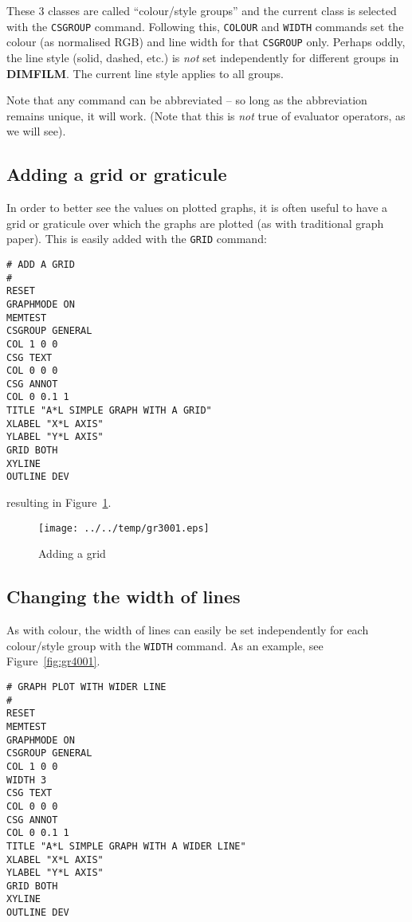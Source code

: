 \documentclass[a4paper,twoside,11pt]{article}
\makeatletter
\def\maxwidth{%
  \ifdim\Gin@nat@width>\linewidth
    \linewidth
  \else
    \Gin@nat@width
  \fi
}
\newcommand{\newpara}{\par\vspace{4mm}\noindent}
\makeatother
\begin{document}
\newpara
These 3 classes are called ``colour/style groups'' and the current class
is selected with the \texttt{CSGROUP} command. Following this,
\texttt{COLOUR} and \texttt{WIDTH} commands set the colour (as
normalised RGB) and line width for that \texttt{CSGROUP} only. Perhaps
oddly, the line style (solid, dashed, etc.) is \emph{not} set
independently for different groups in \textbf{DIMFILM}. The current line style applies to
all groups.

\newpara
Note that any command can be abbreviated -- so long as the abbreviation
remains unique, it will work. (Note that this is \emph{not} true of
evaluator operators, as we will see).


\subsection{Adding a grid or graticule}\label{adding-a-grid-or-graticule}
\newpara
In order to better see the values on plotted graphs, it is often useful
to have a grid or graticule over which the graphs are plotted (as with
traditional graph paper). This is easily added with the \texttt{GRID}
command:

\begin{lstlisting}
# ADD A GRID
#
RESET
GRAPHMODE ON
MEMTEST
CSGROUP GENERAL
COL 1 0 0
CSG TEXT
COL 0 0 0
CSG ANNOT
COL 0 0.1 1
TITLE "A*L SIMPLE GRAPH WITH A GRID"
XLABEL "X*L AXIS"
YLABEL "Y*L AXIS"
GRID BOTH
XYLINE
OUTLINE DEV
\end{lstlisting}

\newpara
resulting in Figure~\ref{fig:gr3001}.

\begin{figure}
  \centering
  \texttt{[image: ../../temp/gr3001.eps]}
  \caption{Adding a grid}
  \label{fig:gr3001}
\end{figure}


\subsection{Changing the width of lines}\label{changing-the-width-of-lines}
\newpara
As with colour, the width of lines can easily be set independently for
each colour/style group with the \texttt{WIDTH} command. As an example,
see Figure~\ref{fig:gr4001}.

\begin{lstlisting}
# GRAPH PLOT WITH WIDER LINE
#
RESET
MEMTEST
GRAPHMODE ON
CSGROUP GENERAL
COL 1 0 0
WIDTH 3
CSG TEXT
COL 0 0 0
CSG ANNOT
COL 0 0.1 1
TITLE "A*L SIMPLE GRAPH WITH A WIDER LINE"
XLABEL "X*L AXIS"
YLABEL "Y*L AXIS"
GRID BOTH
XYLINE
OUTLINE DEV
\end{lstlisting}
\end{document}
